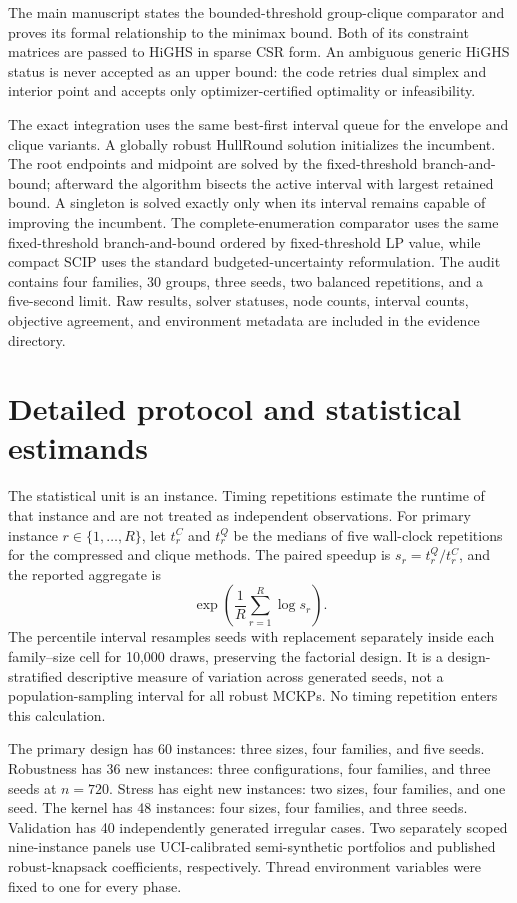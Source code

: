 \documentclass[11pt]{article}
\theoremstyle{plain}
\theoremstyle{definition}
\theoremstyle{remark}
\begin{document}
The main manuscript states the bounded-threshold group-clique comparator and proves its formal relationship to the minimax bound.  Both of its constraint matrices are passed to HiGHS in sparse CSR form.  An ambiguous generic HiGHS status is never accepted as an upper bound: the code retries dual simplex and interior point and accepts only optimizer-certified optimality or infeasibility.

The exact integration uses the same best-first interval queue for the envelope and clique variants.  A globally robust HullRound solution initializes the incumbent.  The root endpoints and midpoint are solved by the fixed-threshold branch-and-bound; afterward the algorithm bisects the active interval with largest retained bound.  A singleton is solved exactly only when its interval remains capable of improving the incumbent.  The complete-enumeration comparator uses the same fixed-threshold branch-and-bound ordered by fixed-threshold LP value, while compact SCIP uses the standard budgeted-uncertainty reformulation.  The audit contains four families, 30 groups, three seeds, two balanced repetitions, and a five-second limit.  Raw results, solver statuses, node counts, interval counts, objective agreement, and environment metadata are included in the evidence directory.

\section{Detailed protocol and statistical estimands}\label{app:protocol}

The statistical unit is an instance.  Timing repetitions estimate the runtime of that instance and are not treated as independent observations.  For primary instance $r\in\{1,\ldots,R\}$, let $t_r^C$ and $t_r^Q$ be the medians of five wall-clock repetitions for the compressed and clique methods.  The paired speedup is $s_r=t_r^Q/t_r^C$, and the reported aggregate is
\[
\exp\left(\frac1R\sum_{r=1}^R\log s_r\right).
\]
The percentile interval resamples seeds with replacement separately inside each family--size cell for 10,000 draws, preserving the factorial design.  It is a design-stratified descriptive measure of variation across generated seeds, not a population-sampling interval for all robust MCKPs.  No timing repetition enters this calculation.

The primary design has 60 instances: three sizes, four families, and five seeds.  Robustness has 36 new instances: three configurations, four families, and three seeds at $n=720$.  Stress has eight new instances: two sizes, four families, and one seed.  The kernel has 48 instances: four sizes, four families, and three seeds.  Validation has 40 independently generated irregular cases.  Two separately scoped nine-instance panels use UCI-calibrated semi-synthetic portfolios and published robust-knapsack coefficients, respectively.  Thread environment variables were fixed to one for every phase.
\end{document}
